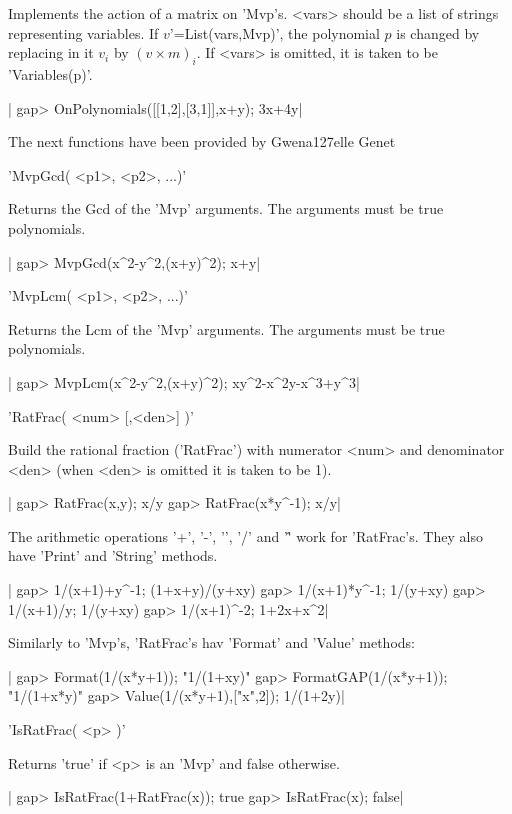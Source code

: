 Implements  the action of  a matrix on  'Mvp's. <vars> should  be a list of
strings representing variables. If $v$'=List(vars,Mvp)', the polynomial $p$
is  changed  by  replacing  in  it  $v_i$  by $(v\times m)_i$. If <vars> is
omitted, it is taken to be 'Variables(p)'.

|    gap> OnPolynomials([[1,2],[3,1]],x+y);    
    3x+4y|


The next functions have been provided by Gwena{\accent 127e}lle Genet


'MvpGcd( <p1>, <p2>, ...)'

Returns  the Gcd  of the  'Mvp' arguments.  The arguments  must be  true
polynomials.

|    gap> MvpGcd(x^2-y^2,(x+y)^2);
    x+y|


'MvpLcm( <p1>, <p2>, ...)'

Returns  the Lcm  of the  'Mvp' arguments.  The arguments  must be  true
polynomials.

|    gap> MvpLcm(x^2-y^2,(x+y)^2);
    xy^2-x^2y-x^3+y^3|

%
%

'RatFrac( <num> [,<den>] )'

Build the rational fraction ('RatFrac') with numerator <num> and denominator 
<den> (when <den> is omitted it is taken to be 1).

|    gap> RatFrac(x,y);
    x/y
    gap> RatFrac(x*y^-1);
    x/y|


The arithmetic operations '+', '-', '\*',  '/' and '\^' work for 'RatFrac's.
They also  have 'Print' and  'String' methods.

|    gap> 1/(x+1)+y^-1;
    (1+x+y)/(y+xy)
    gap> 1/(x+1)*y^-1;
    1/(y+xy)
    gap> 1/(x+1)/y;   
    1/(y+xy)
    gap> 1/(x+1)^-2;
    1+2x+x^2|

Similarly to 'Mvp's, 'RatFrac's hav 'Format' and 'Value' methods:

|    gap> Format(1/(x*y+1));
    "1/(1+xy)"
    gap> FormatGAP(1/(x*y+1));
    "1/(1+x*y)"
    gap> Value(1/(x*y+1),["x",2]);
    1/(1+2y)|

%
%

'IsRatFrac( <p> )'

Returns 'true' if <p> is an 'Mvp' and false otherwise.

|    gap> IsRatFrac(1+RatFrac(x));
    true
    gap> IsRatFrac(x);         
    false|

